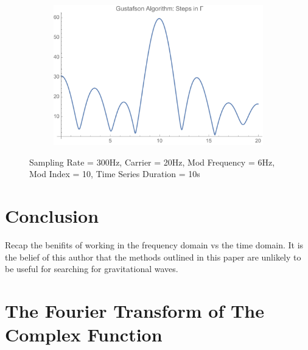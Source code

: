 \documentclass[onecolumn, groupedaddress, 10pt]{revtex4-1}
\begin{document}
\begin{figure}[H]
\begin{subfigure}{.5\textwidth}
  		\caption{}
	\end{subfigure}%
	\begin{subfigure}{.5\textwidth}
  		\centering
  		\includegraphics[width=.9\linewidth]{gustafsonAlgoStepInGamma.pdf}
  		\caption{}
	\end{subfigure}
	\caption{\label{fig:} Sampling Rate = 300Hz, Carrier = 20Hz, Mod Frequency = 6Hz, Mod Index = 10, Time Series Duration = 10s}
\end{figure}

\section{Conclusion}
Recap the benifits of working in the frequency domain vs the time domain.
It is the belief of this author that the methods outlined in this paper are unlikely to be useful for searching for gravitational waves.  


\appendix
\section{The Fourier Transform of The Complex Function}
\end{document}
